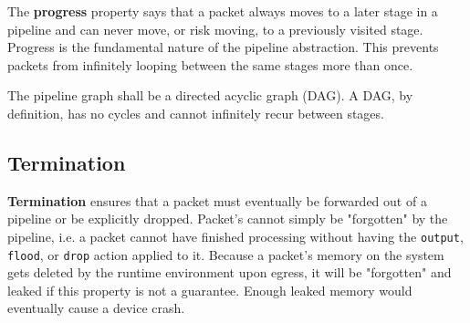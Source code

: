 The \textbf{progress} property says that a packet always moves to a later stage in a pipeline and can never move, or risk moving, to a previously visited stage. Progress is the fundamental nature of the pipeline abstraction. This prevents packets from infinitely looping between the same stages more than once. 

The pipeline graph shall be a directed acyclic graph (DAG). A DAG, by definition, has no cycles and cannot infinitely recur between stages.

%
%

\subsection{Termination} \label{termination_guide}

\textbf{Termination} ensures that a packet must eventually be forwarded out of a pipeline or be explicitly dropped. Packet's cannot simply be "forgotten" by the pipeline, i.e. a packet cannot have finished processing without having the \texttt{output}, \texttt{flood}, or \texttt{drop} action applied to it. Because a packet's memory on the system gets deleted by the runtime environment upon egress, it will be "forgotten" and leaked if this property is not a guarantee. Enough leaked memory would eventually cause a device crash.

